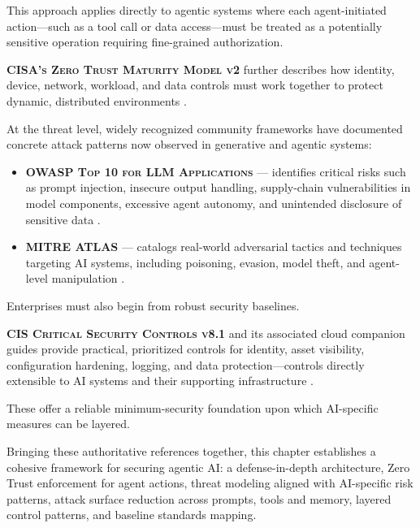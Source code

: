 \begin{TNtwocol}
      This approach applies directly to agentic systems where each agent-initiated action—such as a tool call or data access—must be treated as a potentially sensitive operation requiring fine-grained authorization.

      \textbf{\textsc{CISA's Zero Trust Maturity Model v2}} further describes how identity, device, network, workload, and data controls must work together to protect dynamic, distributed environments \cite{CISA_ZTMM_v2}.

      \vspace{1em}

      At the threat level, widely recognized community frameworks have documented concrete attack patterns now observed in generative and agentic systems:

      \begin{itemize}
            \item \textbf{\textsc{OWASP Top 10 for LLM Applications}} — identifies critical risks such as prompt injection, insecure output handling, supply-chain vulnerabilities in model components, excessive agent autonomy, and unintended disclosure of sensitive data \cite{OWASP_LLM_Top10}.
            \item \textbf{\textsc{MITRE ATLAS}} — catalogs real-world adversarial tactics and techniques targeting AI systems, including poisoning, evasion, model theft, and agent-level manipulation \cite{MITRE_ATLAS}.
      \end{itemize}

      \vspace{1em}

      Enterprises must also begin from robust security baselines.

      \textbf{\textsc{CIS Critical Security Controls v8.1}} and its associated cloud companion guides provide practical, prioritized controls for identity, asset visibility, configuration hardening, logging, and data protection—controls directly extensible to AI systems and their supporting infrastructure \cite{CIS_Controls_v8_1, CIS_Cloud_Companion_v8_1}.

      These offer a reliable minimum-security foundation upon which AI-specific measures can be layered.

      \vspace{1em}

      Bringing these authoritative references together, this chapter establishes a cohesive framework for securing agentic AI: a defense-in-depth architecture, Zero Trust enforcement for agent actions, threat modeling aligned with AI-specific risk patterns, attack surface reduction across prompts, tools and memory, layered control patterns, and baseline standards mapping.


\end{TNtwocol}
